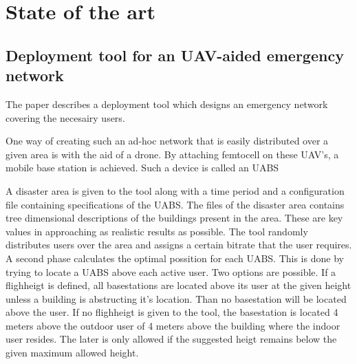 \chapter{State of the art}
\label{chap:stateoftheart}

\section{Deployment tool for an UAV-aided emergency network}
\label{chap:stateoftheart:deploymenttool}


The paper \cite{J2} describes a deployment tool which designs an emergency network covering the necesairy users. 

One way of creating such an ad-hoc network that is easily distributed over a given area is with the aid of a drone.
By attaching femtocell on these UAV's, a mobile base station is achieved. Such a device is called an \gls{UABS}

A disaster area is given to the tool along with a time period and a configuration file containing specifications of the \gls{UABS}. The files of the disaster area contains tree dimensional 
descriptions of the buildings present in the area. These are key values in approaching as realistic results as possible. The tool randomly distributes users over the area and assigns a certain bitrate that 
the user requires. \\

A second phase calculates the optimal possition for each \gls{UABS}. This is done by trying to locate a \gls{UABS} above each active user. Two options are possible.
If a flighheigt is defined, all basestations are located above its user at the given height unless a building is abstructing it's location. Than no basestation will be located above the user.
If no flighheigt is given to the tool, the basestation is located 4 meters above the outdoor user of 4 meters above the building where the indoor user resides. 
The later is only allowed if the suggested heigt remains below the given maximum allowed height. \\

